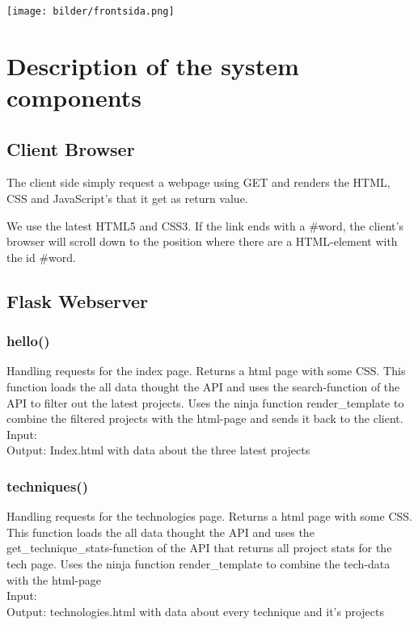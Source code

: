 \documentclass{TDP003mall}
\begin{document}
\texttt{[image: bilder/frontsida.png]}




\newpage
\section{Description of the system components}

\subsection{Client Browser}
The client side simply request a webpage using GET and renders the HTML, CSS and JavaScript’s that it get as return value.

We use the latest HTML5 and CSS3. If the link ends with a #word, the client’s browser will scroll down to the position where there are a HTML-element with the id #word.

\subsection{Flask Webserver}
\subsubsection{hello()}
    Handling requests for the index page. Returns a html page with some CSS.
    This function loads the all data thought the API and uses the search-function of the API to filter out the latest projects.
    Uses the ninja function render\_template to combine the filtered projects with the html-page and sends it back to the client.\\

    Input:\\
    Output: Index.html with data about the three latest projects\\
\subsubsection{techniques()}
    Handling requests for the technologies page. Returns a html page with some CSS.
    This function loads the all data thought the API and uses the get\_technique\_stats-function of the API that returns all project stats for the tech page.
    Uses the ninja function render\_template to combine the tech-data with the html-page\\

    Input:\\
    Output: technologies.html with data about every technique and it's projects\\
\end{document}

